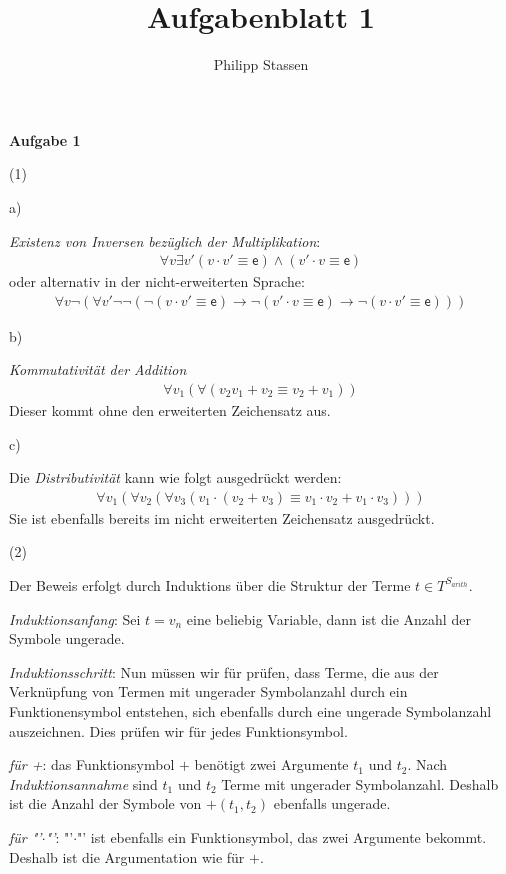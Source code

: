 \documentclass{article}
\title{Aufgabenblatt 1}
\author{Philipp Stassen}
\theoremstyle{definition}
\theoremstyle{plain}
\theoremstyle{remark}
\newcommand{\aufgabe}[1]{
  {
  \vspace*{0.5cm}
  \textsf{\textbf{Aufgabe #1}}
  \vspace*{0.2cm}
  
  }
}
\newcommand{\unteraufgabe}[1]{
  {
  \vspace*{0.2cm}
	\noindent\textsf{(#1)}
  }
}
\newcommand{\teilaufgabe}[1]{
  {
	\noindent 
  \vspace*{0.2cm}
  \hspace*{0,1 cm}
  \textsf{#1)}
  }
}
\begin{document}
\maketitle
\aufgabe1
\unteraufgabe 1

\teilaufgabe a
\textit{Existenz von Inversen bezüglich der Multiplikation}:
\begin{align}
	\forall v \exists v' (v\cdot v'\equiv \mathsf{e}) \wedge (v'\cdot v\equiv \mathsf{e})
\end{align}
oder alternativ in der nicht-erweiterten Sprache:
\begin{align}
	\forall v \neg(\forall v' \neg\neg\left(\neg(v\cdot v'\equiv \mathsf{e}) \rightarrow \neg(v'\cdot v \equiv\mathsf{e}) \rightarrow \neg(v\cdot v'\equiv \mathsf{e} )\right))
\end{align}

\teilaufgabe b
\textit{Kommutativität der Addition}
\begin{align}
	\forall v_1 (\forall (v_2 v_1+v_2\equiv v_2+v_1))
\end{align}
Dieser kommt ohne den erweiterten Zeichensatz aus.

\teilaufgabe c
Die \textit{Distributivität} kann wie folgt ausgedrückt werden:
\begin{align}
	\forall v_1(\forall v_2(\forall v_3(v_1\cdot (v_2+v_3)\equiv v_1\cdot v_2+v_1\cdot v_3)))
\end{align}
Sie ist ebenfalls bereits im nicht erweiterten Zeichensatz ausgedrückt.

\unteraufgabe 2

Der Beweis erfolgt durch Induktions über die Struktur der Terme $t\in T^{S_{arith}}$.\smallskip

\noindent\emph{Induktionsanfang}: Sei $t=v_n$ eine beliebig Variable, dann ist die Anzahl der Symbole ungerade. \smallskip

\noindent\emph{Induktionsschritt}: Nun müssen wir für prüfen, dass Terme, die aus der Verknüpfung von Termen mit ungerader Symbolanzahl durch ein Funktionensymbol entstehen, sich ebenfalls durch eine ungerade Symbolanzahl auszeichnen. Dies prüfen wir für jedes Funktionsymbol.

\emph{für +}: das Funktionsymbol $+$ benötigt zwei Argumente $t_1$ und $t_2$. Nach \emph{Induktionsannahme} sind $t_1$ und $t_2$ Terme mit ungerader Symbolanzahl. Deshalb ist die Anzahl der Symbole von $+(t_1,t_2)$ ebenfalls ungerade.

\emph{für "'$\cdot$"'}: "'$\cdot$"' ist ebenfalls ein Funktionsymbol, das zwei Argumente bekommt. Deshalb ist die Argumentation wie für $+$.
\end{document}
